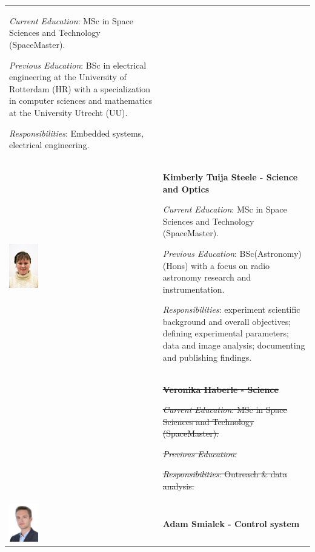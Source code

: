 \begin{longtable}[]{m{} m{}}
\smallskip
\textit{Current Education}: MSc in Space Sciences and Technology (SpaceMaster).

\smallskip
\textit{Previous Education}: BSc in electrical engineering at the University of Rotterdam (HR) with a specialization in computer sciences and mathematics at the University Utrecht (UU).

\smallskip
\textit{Responsibilities}: Embedded systems, electrical engineering.
\bigskip
\\

\includegraphics[width=0.2\textwidth]{0-cover/img/TEAMPICS/Kim_Final.jpg}  & \textbf{Kimberly Tuija Steele - Science and Optics}

\smallskip
\textit{Current Education}: MSc in Space Sciences and Technology (SpaceMaster).

\smallskip
\textit{Previous Education}: BSc(Astronomy)(Hons) with a focus on radio astronomy research and instrumentation.

\smallskip
\textit{Responsibilities}: experiment scientific background and overall objectives; defining experimental parameters; data and image analysis; documenting and publishing findings.

\bigskip
\\

  & \st{\textbf{Veronika Haberle - Science}}

\smallskip
\st{\textit{Current Education}: MSc in Space Sciences and Technology (SpaceMaster).}

\smallskip
\st{\textit{Previous Education}:}

\smallskip
\st{\textit{Responsibilities}: Outreach \& data analysis.}
\bigskip
\\

\includegraphics[width=0.2\textwidth]{0-cover/img/TEAMPICS/Adam_final.jpg}  & \textbf{Adam Smialek - Control system}


\end{longtable}
